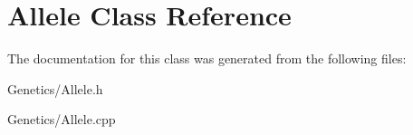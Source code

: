 \hypertarget{class_allele}{}\section{Allele Class Reference}
\label{class_allele}


The documentation for this class was generated from the following files\+:\begin{DoxyCompactItemize}
\item 
Genetics/Allele.\+h\item 
Genetics/Allele.\+cpp\end{DoxyCompactItemize}
